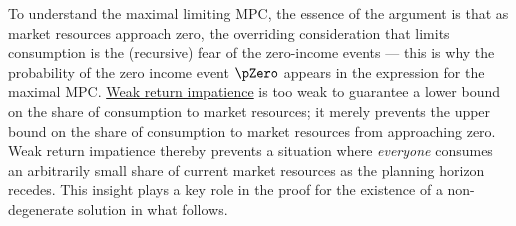 \documentclass[BufferStockTheory]{subfiles}
\begin{document}

To understand the maximal limiting MPC, the essence of the argument is that as market resources approach zero, the overriding consideration that limits consumption is the (recursive) fear of the zero-income events --- this is why the probability of the zero income event $\pZero$ appears in the expression for the maximal MPC. \hyperlink{WRIC}{Weak return impatience} is too weak to guarantee a lower bound on the share of consumption to market resources; it merely prevents the upper bound on the share of consumption to market resources from approaching zero. Weak return impatience thereby prevents a situation where \textit{everyone} consumes an arbitrarily small share of current market resources as the planning horizon recedes. This insight plays a key role in the proof for the existence of a non-degenerate solution in what follows. 

\begin{comment}
AS to AS: improve the intuition above. Incorporate some of the ideas about the rate of market resources and return impatience from the text below?

 


\end{comment}
\end{document}
